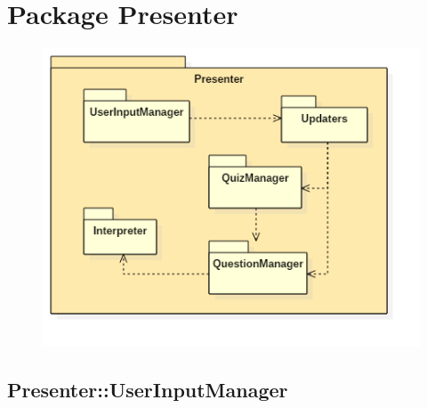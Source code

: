 \section{Package Presenter}
\begin{figure}[h!]
\begin{center}
	\includegraphics[scale=0.7]{../images/PresenterPackage.png}
\end{center}
\end{figure}
\subsection{Presenter::UserInputManager}
